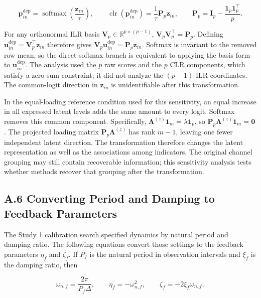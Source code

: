 \documentclass[
]{article}
\begin{document}
\[
\mathbf p^{\mathrm{dep}}_{in}
=\operatorname{softmax}\left(\frac{\mathbf z_{in}}{\tau}\right),
\qquad
\operatorname{clr}\!\left(\mathbf p^{\mathrm{dep}}_{in}\right)
=\frac{1}{\tau}\mathbf P_p\mathbf z_{in},
\qquad
\mathbf P_p
=\mathbf I_p-\frac{\mathbf 1_p\mathbf 1_p^\top}{p}.
\]

For any orthonormal ILR basis
\(\mathbf V_p\in\mathbb R^{p\times(p-1)}\),
\(\mathbf V_p\mathbf V_p^\top=\mathbf P_p\). Defining
\(\mathbf u^{\mathrm{dep}}_{in}=\mathbf V_p^\top\mathbf z_{in}\)
therefore gives
\(\mathbf V_p\mathbf u^{\mathrm{dep}}_{in}=\mathbf P_p\mathbf z_{in}\).
Softmax is invariant to the removed row mean, so the direct-softmax
branch is equivalent to applying the basis form to
\(\mathbf u^{\mathrm{dep}}_{in}\). The analysis used the \(p\) raw
scores and the \(p\) CLR components, which satisfy a zero-sum
constraint; it did not analyze the \((p-1)\) ILR coordinates. The
common-logit direction in \(\mathbf z_{in}\) is unidentifiable after
this transformation.

In the equal-loading reference condition used for this sensitivity, an
equal increase in all expressed latent levels adds the same amount to
every logit. Softmax removes this common component. Specifically,
\(\boldsymbol\Lambda^{(z)}\mathbf 1_m=\lambda\mathbf 1_p\), so
\(\mathbf P_p\boldsymbol\Lambda^{(z)}\mathbf 1_m=\mathbf 0\). The
projected loading matrix \(\mathbf P_p\boldsymbol\Lambda^{(z)}\) has
rank \(m-1\), leaving one fewer independent latent direction. The
transformation therefore changes the latent representation as well as
the associations among indicators. The original channel grouping may
still contain recoverable information; this sensitivity analysis tests
whether methods recover that grouping after the transformation.

\subsection{A.6 Converting Period and Damping to Feedback
Parameters}\label{a.6-converting-period-and-damping-to-feedback-parameters}

The Study 1 calibration search specified dynamics by natural period and
damping ratio. The following equations convert those settings to the
feedback parameters \(\eta_f\) and \(\zeta_f\). If \(P_f\) is the
natural period in observation intervals and \(\xi_f\) is the damping
ratio, then

\[
\omega_{n,f}=\frac{2\pi}{P_f\Delta},
\qquad
\eta_f=-\omega_{n,f}^2,
\qquad
\zeta_f=-2\xi_f\omega_{n,f},
\]
\end{document}
